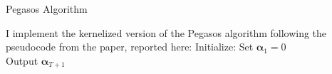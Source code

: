 \begin{algorithm}[H]
    \SetAlgoLined
    \DontPrintSemicolon
    \caption{Pegasos Algorithm}
    I implement the kernelized version of the Pegasos algorithm following the pseudocode from the paper, reported here:
    Initialize: Set $\boldsymbol{\alpha}_1 = 0$\\
    Output $\boldsymbol{\alpha}_{T+1}$\\
\end{algorithm}

